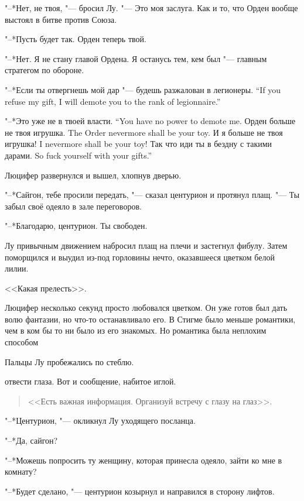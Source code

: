"--*Нет, не твоя, "--- бросил Лу.
"--- Это моя заслуга.
Как и то, что Орден вообще выстоял в битве против Союза.

"--*Пусть будет так.
Орден теперь твой.

"--*Нет.
Я не стану главой Ордена.
Я останусь тем, кем был "--- главным стратегом по обороне.

{"--*Если ты отвергнешь мой дар "--- будешь разжалован в легионеры.}
{``If you refuse my gift, I will demote you to the rank of legionnaire.''}

{"--*Это уже не в твоей власти.}
{``You have no power to demote me.}
{Орден больше не твоя игрушка.}
{The Order nevermore shall be your toy.}
{И я больше не твоя игрушка!}
{I nevermore shall be your toy!}
{Так что иди ты в бездну с такими дарами.}
{So fuck yourself with your gifts.''}

Люцифер развернулся и вышел, хлопнув дверью.

\razd

"--*Сайгон, тебе просили передать, "--- сказал центурион и протянул плащ.
"--- Ты забыл своё одеяло в зале переговоров.

"--*Благодарю, центурион.
Ты свободен.

Лу привычным движением набросил плащ на плечи и застегнул фибулу.
Затем поморщился и выудил из-под горловины нечто, оказавшееся цветком белой лилии.

<<Какая прелесть>>.

Люцифер несколько секунд просто любовался цветком.
Он уже готов был дать волю фантазии, но что-то останавливало его.
В Стигме было меньше романтики, чем в ком бы то ни было из его знакомых.
Но романтика была неплохим способом\ldotst

Пальцы Лу пробежались по стеблю.

\ldotst отвести глаза.
Вот и сообщение, набитое иглой.

\begin{quote}
<<Есть важная информация.
Организуй встречу с глазу на глаз>>.
\end{quote} 

"--*Центурион, "--- окликнул Лу уходящего посланца.

"--*Да, сайгон?

"--*Можешь попросить ту женщину, которая принесла одеяло, зайти ко мне в комнату?

"--*Будет сделано, "--- центурион козырнул и направился в сторону лифтов.

